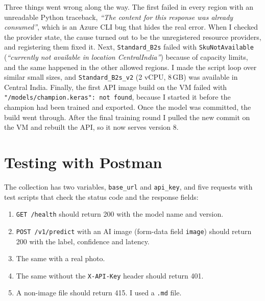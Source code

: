 Three things went wrong along the way. The first  failed in every region with an
unreadable Python traceback, \emph{``The content for this response was already consumed''}, which
is an Azure CLI bug that hides the real error. When I checked the provider state, the cause turned
out to be the unregistered resource providers, and registering them fixed it. Next,
\texttt{Standard\_B2s} failed with \texttt{SkuNotAvailable} (\emph{``currently not available in
location CentralIndia''}) because of capacity limits, and the same happened in the other allowed
regions. I made the script loop over similar small sizes, and \texttt{Standard\_B2s\_v2} (2 vCPU,
8\,GB) was available in Central India. Finally, the first API image build on the VM failed with
\texttt{"/models/champion.keras": not found}, because I started it before the champion had been
trained and exported. Once the model was committed, the build went through. After the final
training round I pulled the new commit on the VM and rebuilt the API, so it now serves version 8.

\section*{Testing with Postman}
The collection  has two variables,
\texttt{base\_url} and \texttt{api\_key}, and five requests with test scripts that check the status
code and the response fields:
\begin{enumerate}
\item \texttt{GET /health} should return 200 with the model name and version.
\item \texttt{POST /v1/predict} with an AI image (form-data field \texttt{image}) should return 200
with the label, confidence and latency.
\item The same with a real photo.
\item The same without the \texttt{X-API-Key} header should return 401.
\item A non-image file should return 415. I used a \texttt{.md} file.
\end{enumerate}

